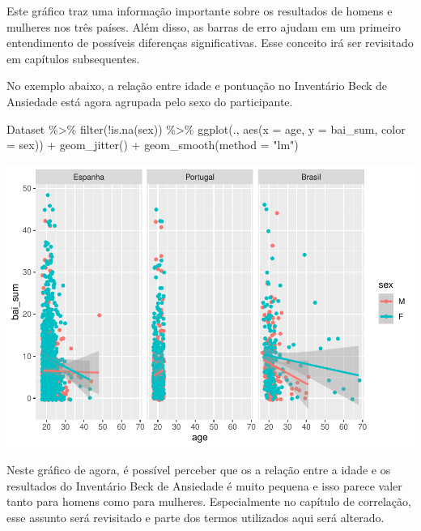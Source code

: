 \documentclass[
]{book}
\newenvironment{Shaded}{\begin{snugshade}}{\end{snugshade}}
\newcommand{\AttributeTok}[1]{\textcolor[rgb]{0.77,0.63,0.00}{#1}}
\newcommand{\FunctionTok}[1]{\textcolor[rgb]{0.00,0.00,0.00}{#1}}
\newcommand{\NormalTok}[1]{#1}
\newcommand{\SpecialCharTok}[1]{\textcolor[rgb]{0.00,0.00,0.00}{#1}}
\newcommand{\StringTok}[1]{\textcolor[rgb]{0.31,0.60,0.02}{#1}}
\begin{document}
Este gráfico traz uma informação importante sobre os resultados de homens e mulheres nos três países. Além disso, as barras de erro ajudam em um primeiro entendimento de possíveis diferenças significativas. Esse conceito irá ser revisitado em capítulos subsequentes.

No exemplo abaixo, a relação entre idade e pontuação no Inventário Beck de Ansiedade está agora agrupada pelo sexo do participante.

\begin{Shaded}
\begin{Highlighting}[]
\NormalTok{Dataset }\SpecialCharTok{\%\textgreater{}\%} 
  \FunctionTok{filter}\NormalTok{(}\SpecialCharTok{!}\FunctionTok{is.na}\NormalTok{(sex)) }\SpecialCharTok{\%\textgreater{}\%} 
  \FunctionTok{ggplot}\NormalTok{(., }\FunctionTok{aes}\NormalTok{(}\AttributeTok{x =}\NormalTok{ age, }\AttributeTok{y =}\NormalTok{ bai\_sum, }\AttributeTok{color =}\NormalTok{ sex)) }\SpecialCharTok{+}
  \FunctionTok{geom\_jitter}\NormalTok{() }\SpecialCharTok{+}
  \FunctionTok{geom\_smooth}\NormalTok{(}\AttributeTok{method =} \StringTok{"lm"}\NormalTok{) }
\end{Highlighting}
\end{Shaded}

\begin{center}\includegraphics{gitbook-demo_files/figure-latex/unnamed-chunk-28-1} \end{center}

Neste gráfico de agora, é possível perceber que os a relação entre a idade e os resultados do Inventário Beck de Ansiedade é muito pequena e isso parece valer tanto para homens como para mulheres. Especialmente no capítulo de correlação, esse assunto será revisitado e parte dos termos utilizados aqui será alterado.
\end{document}
